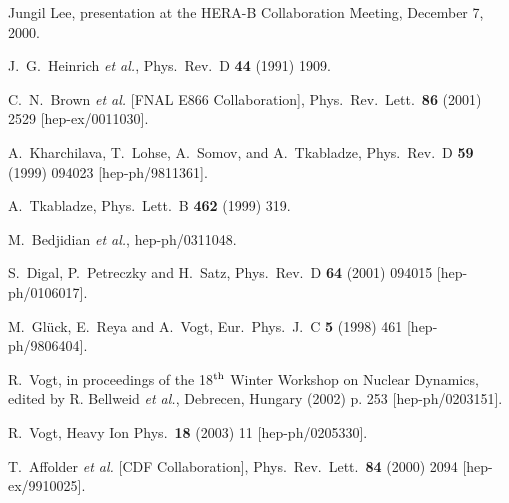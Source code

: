 \begin{thebibliography}{999}
Jungil Lee, presentation at the HERA-B Collaboration Meeting, December 7, 
2000.

J.~G.~Heinrich {\it et al.},
Phys.\ Rev.\ D {\bf 44} (1991) 1909.

C.~N.~Brown {\it et al.}  [FNAL E866 Collaboration],
Phys.\ Rev.\ Lett.\  {\bf 86} (2001) 2529
[hep-ex/0011030].

A.~Kharchilava, T.~Lohse, A.~Somov, and A.~Tkabladze,
Phys.\ Rev.\ D {\bf 59} (1999) 094023
[hep-ph/9811361].

A.~Tkabladze,
Phys.\ Lett.\ B {\bf 462} (1999) 319.


M.~Bedjidian {\it et al.},
hep-ph/0311048.

S.~Digal, P.~Petreczky and H.~Satz,
Phys.\ Rev.\ D {\bf 64} (2001) 094015
[hep-ph/0106017].

M.~Gl\"uck, E.~Reya and A.~Vogt,
Eur.\ Phys.\ J.\ C {\bf 5} (1998) 461
[hep-ph/9806404].

R.~Vogt,
in proceedings of the 18$^{\rm th}$ Winter Workshop on Nuclear
Dynamics, edited by R. Bellweid {\it et al.}, Debrecen, Hungary (2002) p. 253
[hep-ph/0203151].

R.~Vogt,
Heavy Ion Phys.\  {\bf 18} (2003) 11
[hep-ph/0205330].

T.~Affolder {\it et al.}  [CDF Collaboration],
Phys.\ Rev.\ Lett.\  {\bf 84} (2000) 2094
[hep-ex/9910025].


\end{thebibliography}
